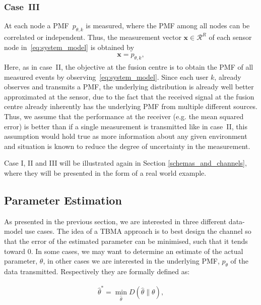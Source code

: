 \documentclass{article}
\begin{document}
\subsubsection{Case~III}\label{case3}
At each node a PMF~$p_{\theta,k}$ is measured, where the PMF among all nodes can be correlated or independent. Thus, the measurement vector $\boldsymbol{x} \in \mathcal{R}^{R}$ of each sensor node in~\ref{eq:system_model} is obtained by
\begin{align}
    \boldsymbol{x} = p_{\theta,k}
    , \label{eq:event03PMF}
\end{align}
Here, as in case~II, the objective at the fusion centre is to obtain the PMF of all measured events by observing~\ref{eq:system_model}. Since each user $k$, already observes and transmits a PMF, the underlying distribution is already well better approximated at the sensor, due to the fact that the received signal at the fusion centre already inherently has the underlying PMF from multiple different sources. Thus, we assume that the performance at the receiver (e.g. the mean squared error) is better than if a single measurement is transmitted like in case~II, this assumption would hold true as more information about any given environment and situation is known to reduce the degree of uncertainty in the measurement.

Case I, II and III will be illustrated again in Section \ref{schemas_and_channels}, where they will be presented in the form of a real world example. 

\subsection{Parameter Estimation}\label{param_estimation}

As presented in the previous section, we are interested in three different data-model use cases. The idea of a TBMA  approach is to best design the channel so that the error of the estimated parameter can be minimised, such that it tends toward 0.  In some cases, we may want to determine an estimate of the actual parameter, $\theta$, in other cases we are interested in the underlying PMF, $p_{\theta}$ of the data transmitted. Respectively they are formally defined as:

\begin{align}
\hat{\theta}^* = \min_{\hat{\theta}} D(\hat{\theta}\|{\theta}),      
\end{align}
\end{document}
